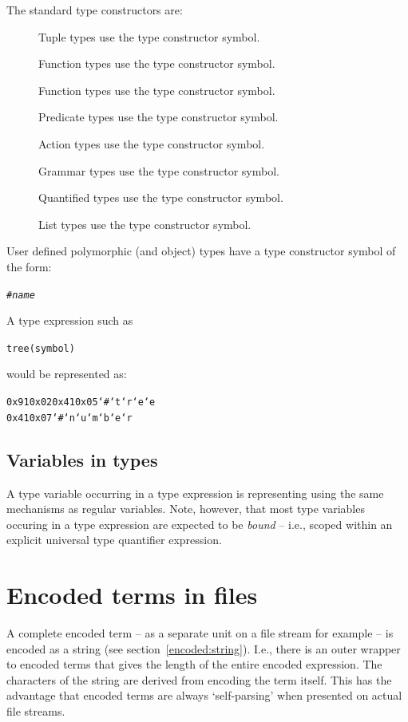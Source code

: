 The standard type constructors are:
\begin{description}
\item[\q{()}] Tuple types use the \q{\hash()} type constructor symbol.
\item[\q{\classtype}] Function types use the \q{\hash\classtype} type constructor symbol.
\item[\q{=>}] Function types use the \q{\hash=>} type constructor symbol.
\item[\q{\{\}}] Predicate types use the \q{\hash\{\}} type constructor symbol.
\item[\q{*}] Action types use the \q{\hash*} type constructor symbol.
\item[\q{-->}] Grammar types use the \q{\hash-->} type constructor symbol.
\item[\q{-}] Quantified types use the \q{\hash-} type constructor symbol.
\item[\q{[]}] List types use the \q{\hash[]} type constructor symbol.
\end{description}

User defined polymorphic (and object) types have a type constructor symbol of the form:
\begin{alltt}
#\emph{name}
\end{alltt}
A type expression such as
\begin{alltt}
tree(symbol)
\end{alltt}
would be represented as:
\begin{alltt}
0x91 0x02 0x41 0x05 `# `t `r `e `e 
          0x41 0x07 `# `n `u `m `b `e `r
\end{alltt}

\subsection{Variables in types}
\label{encoded:types:variable}

A type variable occurring in a type expression is representing using the same mechanisms as regular variables. Note, however, that most type variables occuring in a type expression are expected to be \emph{bound} -- i.e., scoped within an explicit universal type quantifier expression.


\section{Encoded terms in files}
\label{encoded:terms}

A complete encoded term -- as a separate unit on a file stream for example -- is encoded as a string (see section~\vref{encoded:string}). I.e., there is an outer wrapper to encoded terms that gives the length of the entire encoded expression. The characters of the string are derived from encoding the term itself. This has the advantage that encoded terms are always `self-parsing' when presented on actual file streams.

